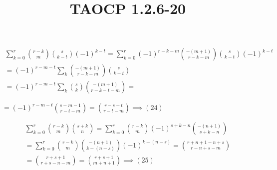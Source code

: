 \documentclass{article}
\title{TAOCP 1.2.6\mbox{-}20}
\begin{document}
\maketitle

\begin{multline*}
\sum_{k=0}^{r} \binom{r-k}{m}\binom{s}{k-t}{(-1)}^{k-t} = \sum_{k=0}^{r} {(-1)}^{r-k-m} \binom{-(m+1)}{r-k-m}\binom{s}{k-t}{(-1)}^{k-t} \\
= {(-1)}^{r-m-t} \sum_{k} \binom{-(m+1)}{r-k-m}\binom{s}{k-t} \\
= {(-1)}^{r-m-t} \sum_{k} \binom{s}{k} \binom{-(m+1)}{r-k-t-m} =
\end{multline*}

\( = {(-1)}^{r-m-t} \binom{s-m-1}{r-t-m} = \binom{r-s-t}{r-t-m} \implies (24) \)

\begin{multline*}
\sum_{k=0}^{r} \binom{r-k}{m}\binom{s+k}{n} = \sum_{k=0}^{r} \binom{r-k}{m}{(-1)}^{s+k-n}\binom{-(n+1)}{s+k-n} \\
= \sum_{k=0}^{r} \binom{r-k}{m}\binom{-(n+1)}{k-(n-s)}{(-1)}^{k-(n-s)} = \binom{r+n+1-n+s}{r-n+s-m} \\
= \binom{r+s+1}{r+s-n-m} = \binom{r+s+1}{m+n+1} \implies (25)
\end{multline*}
\end{document}
